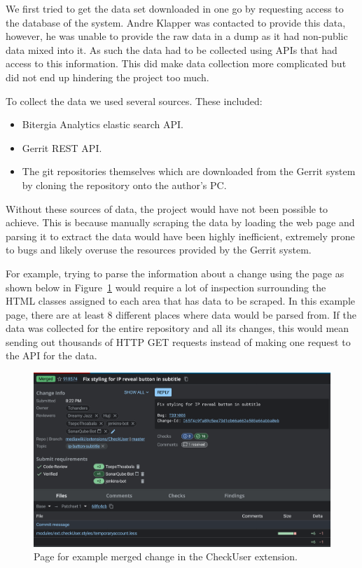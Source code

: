 We first tried to get the data set downloaded in one go by requesting access to the database of the system. Andre Klapper was contacted to provide this data, however, he was unable to provide the raw data in a dump as it had non-public data mixed into it. As such the data had to be collected using APIs that had access to this information. This did make data collection more complicated but did not end up hindering the project too much.

To collect the data we used several sources. These included:
\begin{itemize}
    \item Bitergia Analytics elastic search API.
    \item Gerrit REST API.
    \item The git repositories themselves which are downloaded from the Gerrit system by cloning the repository onto the author's PC.
\end{itemize}

Without these sources of data, the project would have not been possible to achieve. This is because manually scraping the data by loading the web page and parsing it to extract the data would have been highly inefficient, extremely prone to bugs and likely overuse the resources provided by the Gerrit system.

For example, trying to parse the information about a change using the page as shown below in Figure~\ref{fig:checkuser-example-change-for-scraping-example} would require a lot of inspection surrounding the HTML classes assigned to each area that has data to be scraped. In this example page, there are at least 8 different places where data would be parsed from. If the data was collected for the entire repository and all its changes, this would mean sending out thousands of HTTP GET requests instead of making one request to the API for the data.

\begin{figure}[h]
    \centering
    \includegraphics[scale=0.23]{images/checkuser-example-change-information-page.png}
    \caption{Page for example merged change in the CheckUser extension.}
    \label{fig:checkuser-example-change-for-scraping-example}
\end{figure}

